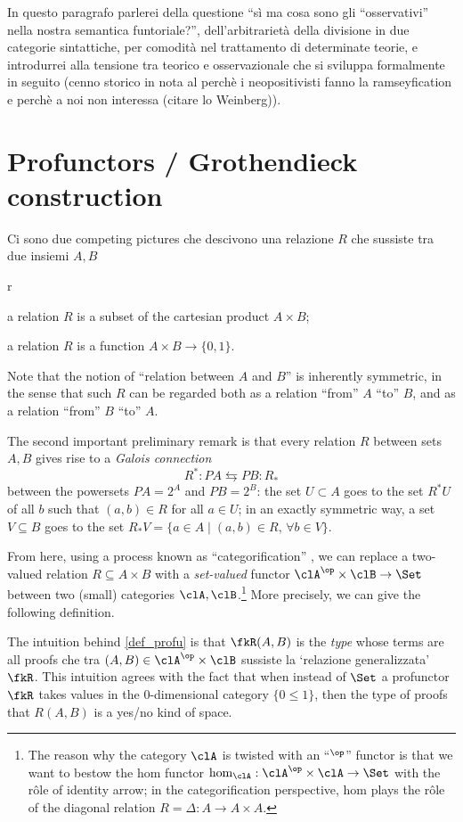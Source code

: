 \documentclass[a4paper]{../birkjour}
\begin{document}
In questo paragrafo parlerei della questione ``sì ma cosa sono gli ``osservativi'' nella nostra semantica funtoriale?'', dell'arbitrarietà della divisione in due categorie sintattiche, per comodità nel trattamento di determinate teorie, e introdurrei alla tensione tra teorico e osservazionale che si sviluppa formalmente in seguito (cenno storico in nota al perchè i neopositivisti fanno la ramseyfication e perchè a noi non interessa (citare lo Weinberg)).  

\section{Profunctors / Grothendieck construction}
\label{sec:org7dd09e1}
Ci sono due competing pictures che descivono una relazione $R$ che sussiste tra due insiemi $A,B$
\begin{enumtag}{r}
\item \label{r_1} a relation $R$ is a subset of the cartesian product $A\times B$;
\item \label{r_2} a relation $R$ is a function $A\times B \to \{0,1\}$.
\end{enumtag}
Note that the notion of ``relation between $A$ and $B$'' is inherently symmetric, in the sense that such $R$ can be regarded both as a relation ``from'' $A$ ``to'' $B$, and as a relation ``from'' $B$ ``to'' $A$.

The second important preliminary remark is that every relation $R$ between sets $A,B$ gives rise to a \emph{Galois connection} 
\[R^* :PA \leftrightarrows PB : R_* \label{adjunzia} \]
between the powersets $PA=2^A$ and $PB = 2^B$: the set $U\subset A$ goes to the set $R^*U$ of all $b$ such that $(a,b)\in R$ for all $a\in U$; in an exactly symmetric way, a set $V\subseteq B$ goes to the set $R_*V = \{a\in A\mid (a,b) \in R,\, \forall b\in V\}$.

From here, using a process known as ``categorification'' \cite{baez_catego}, we can replace a two-valued relation $R\subseteq A\times B$ with a \emph{set-valued} functor $\clA^\op\times\clB \to \Set$ between two (small) categories $\clA,\clB$.\footnote{The reason why the category $\clA$ is twisted with an ``$^\op$'' functor is that we want to bestow the hom functor $\hom_{\clA} : \clA^\op\times\clA \to \Set$ with the r\^ole of identity arrow; in the categorification perspective, hom plays the r\^ole of the diagonal relation $R=\Delta : A\to A\times A$.} More precisely, we can give the following definition.
\begin{definition}[Profunctor]\label{def_profu}
  
\end{definition}
The intuition behind \autoref{def_profu} is that $\fkR(A,B)$ is the \emph{type} whose terms are all proofs che tra $(A,B)\in\clA^\op\times\clB$ sussiste la `relazione generalizzata' $\fkR$. This intuition agrees with the fact that when instead of $\Set$ a profunctor $\fkR$ takes values in the 0-dimensional category $\{0\le 1\}$, then the type of proofs that $R(A,B)$ is a yes/no kind of space.
\end{document}
